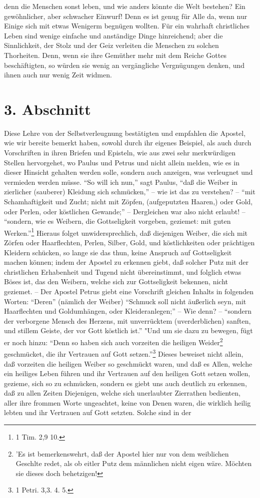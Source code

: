 denn die Menschen sonst leben, und wie anders könnte die Welt bestehen? Ein gewöhnlicher, aber schwacher Einwurf! Denn es ist genug für Alle da, wenn nur Einige sich mit etwas Wenigerm begnügen wollten. Für ein wahrhaft christliches Leben sind wenige einfache und anständige Dinge hinreichend; aber die Sinnlichkeit, der Stolz und der Geiz verleiten die Menschen zu solchen Thorheiten. Denn, wenn sie ihre Gemüther mehr mit dem Reiche Gottes beschäftigten, so würden sie wenig an vergängliche Vergnügungen denken, und ihnen auch nur wenig Zeit widmen.

\section{3. Abschnitt}

Diese Lehre von der Selbstverleugnung bestätigten und empfahlen die Apostel, wie wir bereite bemerkt haben, sowohl durch ihr eigenes Beispiel, als auch durch Vorschriften in ihren Briefen und Episteln, wie aus zwei sehr merkwürdigen Stellen hervorgehet, wo Paulus und Petrus und nicht allein melden, wie es in dieser Hinsicht gehalten werden solle, sondern auch anzeigen, was verleugnet und vermieden werden müsse. "`So will ich nun,"' sagt Paulus, "`daß die Weiber in zierlicher (sauberer) Kleidung sich schmücken,"' -- wie ist das zu verstehen? -- "`mit Schamhaftigkeit und Zucht; nicht mit Zöpfen, (aufgeputzten Haaren,) oder Gold, oder Perlen, oder köstlichen Gewande;"' -- Dergleichen war also nicht erlaubt! -- "`sondern, wie es Weibern, die Gottseligkeit vorgeben, geziemet: mit guten Werken."'\footnote{1 Tim. 2,9 10.} Hieraus folget unwidersprechlich, daß diejenigen Weiber, die sich mit Zörfen oder Haarflechten, Perlen, Silber, Gold, und köstlichkeiten oder prächtigen Kleidern schücken, so lange sie das thun, keine Anspruch auf Gottseligkeit machen können; indem der Apostel zu erkennen giebt, daß solcher Putz mit der christlichen Erhabenheit und Tugend nicht übereinstimmt, und folglich etwas Böses ist, das den Weibern, welche sich zur Gottseligkeit bekennen, nicht geziemet. -- Der Apostel Petrus giebt eine Vorschrift gleichen Inhalts in folgenden Worten: "`Deren"' (nämlich der Weiber) "`Schmuck soll nicht äußerlich seyn, mit Haarflechten und Goldumhängen, oder Kleideranlegen;"' -- Wie denn? -- "`sondern der verborgene Mensch des Herzens, mit unverrücktem (uverderblichen) sanften, und stillem Geiste, der vor Gott köstlich ist."' "Und um sie dazu zu bewegen, fügt er noch hinzu: "`Denn so haben sich auch vorzeiten die heiligen Weider\footnote{’Es ist bemerkenswehrt, daß der Apostel hier nur von dem weiblichen Geschlte redet, als ob eitler Putz dem männlichen nicht eigen wäre. Möchten sie dieses doch behetzigen!} geschmücket, die ihr Vertrauen auf Gott setzen."'\footnote{1 Petri. 3,3. 4. 5.} Dieses beweiset nicht allein, daß vorzeiten die heiligen Weiber so geschmückt waren, und daß es Allen, welche ein heiliges Leben führen und ihr Vertrauen auf den heiligen Gott setzen wollen, gezieme, sich so zu schmücken, sondern es giebt uns auch deutlich zu erkennen, daß zu allen Zeiten Diejenigen, welche sich unerlaubter Zierrathen bedienten, aller ihre frommen Worte ungeachtet, keine von Denen waren, die wirklich heilig lebten und ihr Vertrauen auf Gott setzten. Solche sind in der 